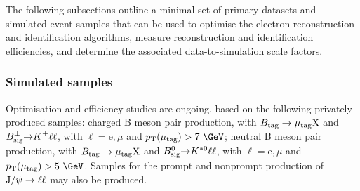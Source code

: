 The following subsections outline a minimal set of primary datasets
and simulated event samples that can be used to optimise the electron
reconstruction and identification algorithms, measure reconstruction
and identification efficiencies, and determine the associated
data-to-simulation scale factors.



\subsubsection{Simulated samples}
\label{sec:simulated_samples}

Optimisation and efficiency studies are ongoing, based on the
following privately produced samples:
charged B meson pair production, with $B_\mathrm{tag}\to\mu_\mathrm{tag}\mathrm{X}$ and $B^{\pm}_\mathrm{sig}{\to}K^{\pm}\ell\ell$, with
$\ell = \mathrm{e}, \mu$ and $\pt(\mu_\mathrm{tag}) > 7~\GeV$;
neutral B meson pair production, with $B_\mathrm{tag}\to\mu_\mathrm{tag}\mathrm{X}$ and $B^{0}_\mathrm{sig}{\to}K^{*0}\ell\ell$, with
$\ell = \mathrm{e}, \mu$ and $\pt(\mu_\mathrm{tag}) > 5~\GeV$.
Samples for the prompt and nonprompt production of $\mathrm{J/}\psi\to\ell\ell$ may also
be produced.

